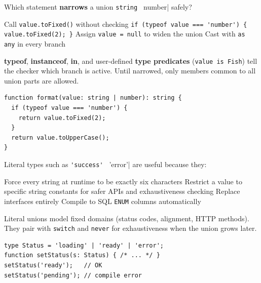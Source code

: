 \newpage



\question[4]
Which statement \textbf{narrows} a union \lstinline[style=tsinline]|string | number| safely?
\begin{choices}
  \choice Call \lstinline[style=tsinline]|value.toFixed()| without checking
  \CorrectChoice \lstinline[style=tsinline]|if (typeof value === 'number') { value.toFixed(2); }|
  \choice Assign \lstinline[style=tsinline]|value = null| to widen the union
  \choice Cast with \lstinline[style=tsinline]|as any| in every branch
\end{choices}
\begin{solution}
  \textbf{typeof}, \textbf{instanceof}, \textbf{in}, and user-defined \textbf{type predicates} (\lstinline[style=tsinline]|value is Fish|) tell the checker which branch is active. Until narrowed, only members common to all union parts are allowed.
\begin{lstlisting}[style=ts]
function format(value: string | number): string {
  if (typeof value === 'number') {
    return value.toFixed(2);
  }
  return value.toUpperCase();
}
\end{lstlisting}
\end{solution}

\question[4]
Literal types such as \lstinline[style=tsinline]|'success' | 'error'| are useful because they:
\begin{choices}
  \choice Force every string at runtime to be exactly six characters
  \CorrectChoice Restrict a value to specific string constants for safer APIs and exhaustiveness checking
  \choice Replace interfaces entirely
  \choice Compile to SQL \texttt{ENUM} columns automatically
\end{choices}
\begin{solution}
  Literal unions model fixed domains (status codes, alignment, HTTP methods). They pair with \lstinline[style=tsinline]|switch| and \lstinline[style=tsinline]|never| for exhaustiveness when the union grows later.
\begin{lstlisting}[style=ts]
type Status = 'loading' | 'ready' | 'error';
function setStatus(s: Status) { /* ... */ }
setStatus('ready');   // OK
setStatus('pending'); // compile error
\end{lstlisting}
\end{solution}

